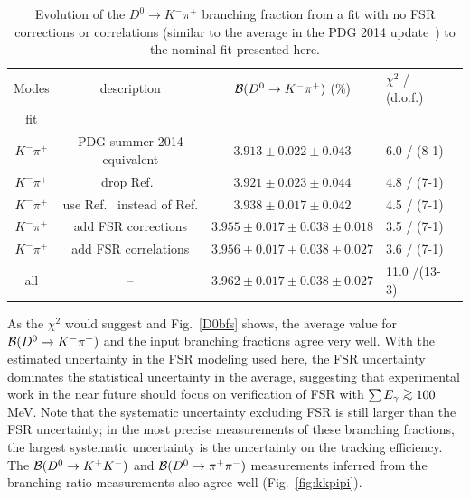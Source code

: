 \begin{table}[!htb]
  \centering 
  \caption{Evolution of the $D^0\to K^-\pi^+$ branching fraction from a fit with
  no FSR corrections or correlations (similar to the average in the %
  PDG 2014 update~\cite{PDG_2014}) to the nominal fit presented
here.}\label{tab:fit_evolution}
\begin{tabular}{cccll}
\hline\hline
Modes &  description                       & ${\cal B}(D^0\to K^-\pi^+)$ (\%)           & $\chi^2$ / (d.o.f.) \\
fit        &                               &                                       & \\ \hline
$K^-\pi^+$ & PDG summer 2014 equivalent    & $3.913 \pm 0.022 \pm 0.043 $ & 6.0 / (8-1)\\
$K^-\pi^+$ & drop Ref.~\cite{Coan:1997ye}  & $3.921 \pm 0.023 \pm 0.044$           & 4.8 / (7-1)\\
$K^-\pi^+$ & use Ref.~\cite{Bonvicini:2013vxi} instead of Ref.\cite{Dobbs:2007zt}  & $3.938 \pm 0.017 \pm 0.042$ & 4.5 / (7-1)\\
$K^-\pi^+$ & add FSR corrections           & $3.955 \pm 0.017 \pm 0.038 \pm 0.018$ & 3.5 / (7-1)\\
$K^-\pi^+$ & add FSR correlations          & $3.956 \pm 0.017 \pm 0.038 \pm 0.027$ & 3.6 / (7-1)\\
all        & --   & $3.962 \pm 0.017 \pm 0.038 \pm 0.027$ &11.0 /(13-3) \\
\hline
\end{tabular}
\end{table}

As the $\chi^2$ would suggest and Fig.~\ref{D0bfs} shows, the average 
value for ${\cal B}(D^0\to K^-\pi^+)$ and
the input branching fractions agree very well.  With the estimated 
uncertainty in the FSR modeling used here,
the FSR uncertainty dominates the statistical uncertainty 
in the average, suggesting that experimental
work in the near future should focus on verification of FSR with 
$\sum E_\gamma \simge 100$ MeV.  Note that the systematic uncertainty 
excluding FSR
is still larger than the FSR uncertainty; in the most 
precise measurements of these branching fractions, the 
largest systematic
uncertainty is the uncertainty on the tracking efficiency. The ${\cal B}(D^0\to
K^+K^-)$ and ${\cal B}(D^0\to \pi^+\pi^-)$ measurements inferred
from the branching ratio measurements also agree well 
(Fig.~\ref{fig:kkpipi}). 

